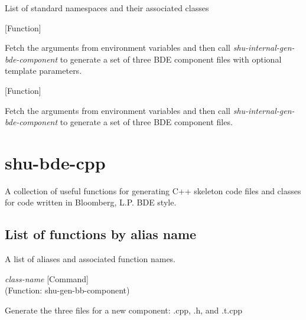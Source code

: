 \begin{doc-string}
List of standard namespaces and their associated classes
\end{doc-string}

\vspace{1em}
\noindent
{}
\usebox{\funcname}
 \hfill [Function]

\begin{doc-string}
Fetch the arguments from environment variables and then call
\emph{shu-internal-gen-bde-component} to generate a set of three BDE component
files with optional template parameters.
\end{doc-string}

\vspace{1em}
\noindent
{}
\usebox{\funcname}
 \hfill [Function]

\begin{doc-string}
Fetch the arguments from environment variables and then call
\emph{shu-internal-gen-bde-component} to generate a set of three BDE component
files.
\end{doc-string}

\eject
\section{shu-bde-cpp}


A collection of useful functions for generating C++ skeleton code files
and classes for code written in Bloomberg, L.P. BDE style.


\subsection{List of functions by alias name}

A list of aliases and associated function names.



\vspace{1em}
\noindent
{}
\usebox{\funcname}\emph{class-name}
 \hfill [Command]\\%
 (Function: shu-gen-bb-component)

\begin{doc-string}
Generate the three files for a new component: .cpp, .h, and .t.cpp
\end{doc-string}


